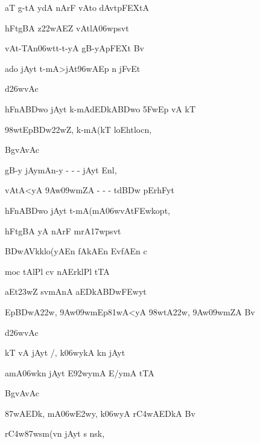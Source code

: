 {\dn aT g\5-tA ydA nArF vAto dAvt\0pFEXtA{\dandabdn} \dontdisplaylinenum}

{\dn {}hFtgBA\0 z\322wAEZ vAtlA\306wps\?vt\? \vegdn\dontdisplaylinenum}

{\dn vAt-TAn\306wtt-t-yA gB\0-yApFEXt\2 Bv\? \dontdisplaylinenum}

{\dn ado jAyt\? t-mA>jAt\396wAEp n jFvEt \vegdn\dontdisplaylinenum}

{\dn d\?\326wvAc{\dandabdn}\dontdisplaylinenum }

{\dn hFnA\3BDwo jAyt\? k-mAdEDkA\3BDwo \35FwEp vA kT \dontdisplaylinenum}

{\dn \398w\?tEp\3BDw\?\322wZ, k-mA(kT\2 loEhtlocn, \vegdn\dontdisplaylinenum}

{\dn BgvAvAc{\dandabdn}\dontdisplaylinenum }

{\dn gB\0-y jAymAn-y {\rs -\re} {\rs -\re} {\rs -\re}  jAyt\? Enl,{\dandadn} \dontdisplaylinenum}

{\dn vAtA<yA\2 \39Aw\?\309wmZA {\rs -\re} {\rs -\re} {\rs -\re} td\3BDw\2 pErhFyt\? \vegdn\dontdisplaylinenum}

{\dn hFnA\3BDwo jAyt\? t-mA(mA\306wvAt\3FEwkopt,{\dandabdn} \dontdisplaylinenum}

{\dn {}hFtgBA\0 yA nArF mrA\317wps\?vt\? \vegdn\dontdisplaylinenum}

{\dn {}\3BDwAVkklo(yAEn fAkAEn EvfAEn c{\dandabdn} \dontdisplaylinenum}

{\dn moc\2 tAlPl\2 c\4v nAErk\?lPl\2 tTA \vegdn\dontdisplaylinenum}

{\dn aEt\323wZ\2 s\?vmAnA  aEDkA\3BDw\2\3FEwyt\?{\dandabdn} \dontdisplaylinenum}

{\dn Ep\3BDwA\322w, \39Aw\?\309wmEp\381wA<yA\2 \398w\?tA\322w, \39Aw\?\309wmZA Bv\? \vegdn\dontdisplaylinenum}

{\dn d\?\326wvAc{\dandabdn}\dontdisplaylinenum }

{\dn kT\2 vA jAyt\? /, k\306wykA k\?n jAyt\?{\dandadn} \dontdisplaylinenum}

{\dn amA\306wk\?n jAy\?t E\392wymA E/ymA tTA \vegdn\dontdisplaylinenum}

{\dn BgvAvAc{\dandabdn}\dontdisplaylinenum }

{\dn {}\387wAEDk, mA\306w\3E2w\?y, k\306wyA r\3C4wAEDkA Bv\? \dontdisplaylinenum}

{\dn r\3C4w\387wsm(v\?n jAyt\? s n\2sk, \vegdn\dontdisplaylinenum}

